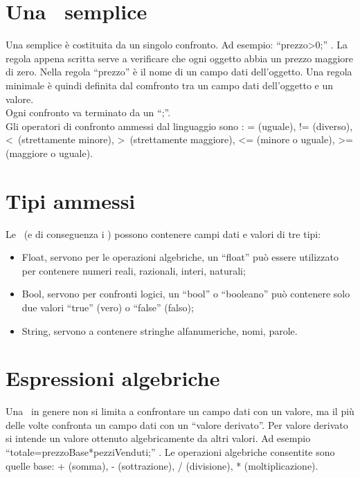 \begin{center}
\section{Una \br\ semplice}
Una \br semplice \`e costituita da un singolo confronto. Ad esempio: ``prezzo\textgreater0;'' . La regola appena scritta serve a verificare che ogni oggetto abbia un prezzo maggiore di zero. Nella regola ``prezzo'' \`e il nome di un campo dati dell'oggetto. Una regola minimale \`e quindi definita dal comfronto tra un campo dati dell'oggetto e un valore. \\
Ogni confronto va terminato da un ``;''. \\
Gli operatori di confronto ammessi dal linguaggio sono : = (uguale), != (diverso), \textless\ (strettamente minore), \textgreater\ (strettamente maggiore),  \textless= (minore o uguale), \textgreater= (maggiore o uguale).

\section{Tipi ammessi}
Le \br\ (e di conseguenza i \bo) possono contenere campi dati e valori di tre tipi:
\begin{itemize}
\item Float, servono per le operazioni algebriche, un ``float'' pu\`o essere utilizzato per contenere numeri reali, razionali, interi, naturali;
\item Bool, servono per confronti logici, un ``bool'' o ``booleano'' pu\`o contenere solo due valori ``true'' (vero) o ``false'' (falso);
\item String, servono a contenere stringhe alfanumeriche, nomi, parole.
\end{itemize}

\section{Espressioni algebriche}
Una \br\ in genere non si limita a confrontare un campo dati con un valore, ma il pi\`u delle volte confronta un campo dati con un ``valore derivato''. Per valore derivato si intende un valore ottenuto algebricamente da altri valori. Ad esempio ``totale=prezzoBase*pezziVenduti;'' . Le operazioni algebriche consentite sono quelle base: + (somma), - (sottrazione), / (divisione), * (moltiplicazione).


\end{center}
